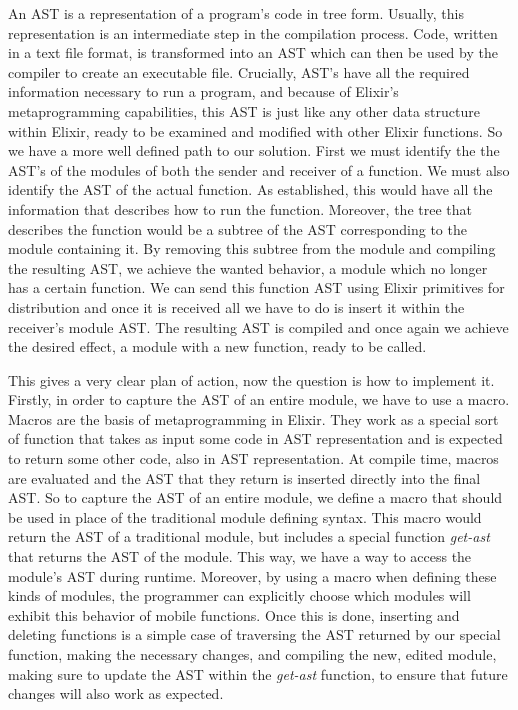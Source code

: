 An AST is a representation of a program's code in tree form. Usually, this representation is an intermediate step in the compilation process. Code, written in a text file format, is transformed into an AST which can then be used by the compiler to create an executable file. Crucially, AST's have all the required information necessary to run a program, and because of Elixir's metaprogramming capabilities, this AST is just like any other data structure within Elixir, ready to be examined and modified with other Elixir functions. So we have a more well defined path to our solution. First we must identify the the AST's of the modules of both the sender and receiver of a function. We must also identify the AST of the actual function. As established, this would have all the information that describes how to run the function. Moreover, the tree that describes the function would be a subtree of the AST corresponding to the module containing it. By removing this subtree from the module and compiling the resulting AST, we achieve the wanted behavior, a module which no longer has a certain function. We can send this function AST using Elixir primitives for distribution and once it is received all we have to do is insert it within the receiver's module AST. The resulting AST is compiled and once again we achieve the desired effect, a module with a new function, ready to be called.

This gives a very clear plan of action, now the question is how to implement it. Firstly, in order to capture the AST of an entire module, we have to use a macro. Macros are the basis of metaprogramming in Elixir. They work as a special sort of function that takes as input some code in AST representation and is expected to return some other code, also in AST representation. At compile time, macros are evaluated and the AST that they return is inserted directly into the final AST. So to capture the AST of an entire module, we define a macro that should be used in place of the traditional module defining syntax. This macro would return the AST of a traditional module, but includes a special function \textit{get-ast} that returns the AST of the module. This way, we have a way to access the module's AST during runtime. Moreover, by using a macro when defining these kinds of modules, the programmer can explicitly choose which modules will exhibit this behavior of mobile functions. Once this is done, inserting and deleting functions is a simple case of traversing the AST returned by our special function, making the necessary changes, and compiling the new, edited module, making sure to update the AST within the \textit{get-ast} function, to ensure that future changes will also work as expected.


